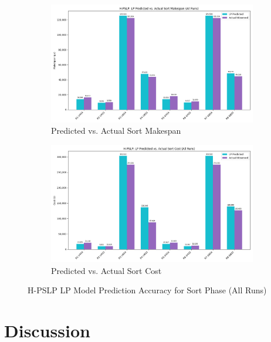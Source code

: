 \documentclass[]{interact}
\theoremstyle{plain}
\theoremstyle{definition}
\theoremstyle{remark}
\begin{document}
\begin{figure}[H]
    \centering
    \begin{subfigure}{0.48\textwidth}
        \includegraphics[width=\textwidth]{src/out_matplotlib_charts/pred_vs_actual_makespan_hpslp.png}
        \caption{Predicted vs. Actual Sort Makespan}
        \label{fig:m10}
    \end{subfigure}
    \hfill
    \begin{subfigure}{0.48\textwidth}
        \includegraphics[width=\textwidth]{src/out_matplotlib_charts/pred_vs_actual_cost_hpslp.png}
        \caption{Predicted vs. Actual Sort Cost}
        \label{fig:m11}
    \end{subfigure}
    \caption{H-PSLP LP Model Prediction Accuracy for Sort Phase (All Runs)}
    \label{fig:pred_vs_actual}
\end{figure}

\section{Discussion}
\end{document}
